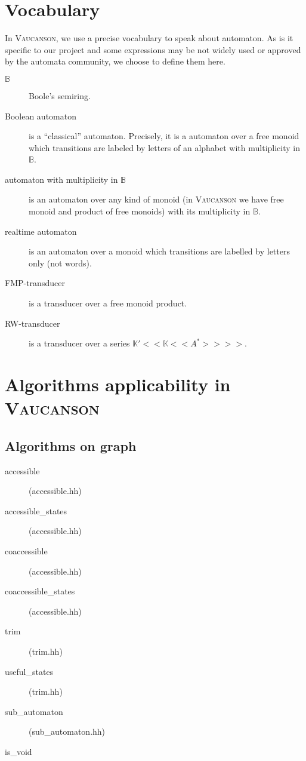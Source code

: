 \documentclass[a4paper]{report}
\newcommand{\Vauc}{\textsc{Vaucanson}\xspace}
\begin{document}
\section{Vocabulary}

In \Vauc, we use a precise vocabulary to speak about automaton. As is
it specific to our project and some expressions may be not widely used
or approved by the automata community, we choose to define them here.

\begin{description}
\item[$\mathbb{B}$] Boole's semiring.

\item[Boolean automaton] is a ``classical'' automaton. Precisely, it
  is a automaton over a free monoid which transitions are labeled by
  letters of an alphabet with multiplicity in $\mathbb{B}$.

\item[automaton with multiplicity in $\mathbb{B}$] is an automaton
  over any kind of monoid (in \Vauc we have free monoid and product
  of free monoids) with its multiplicity in $\mathbb{B}$.

\item[realtime automaton] is an automaton over a monoid which
  transitions are labelled by letters only (not words).

\item[FMP-transducer] is a transducer over a free monoid product.

\item[RW-transducer] is a transducer over a series $\mathbb{K'}<< \mathbb{K}<<A^*>> >>$.
\end{description}

\section{Algorithms applicability in \Vauc}




\subsection{Algorithms on graph}

\begin{description}
\item[accessible] (accessible.hh)
\item[accessible\_states] (accessible.hh)
\item[coaccessible] (accessible.hh)
\item[coaccessible\_states] (accessible.hh)
\item[trim] (trim.hh)
\item[useful\_states] (trim.hh)
\item[sub\_automaton] (sub\_automaton.hh)
\item[is\_void] %
\end{description}
\end{document}
